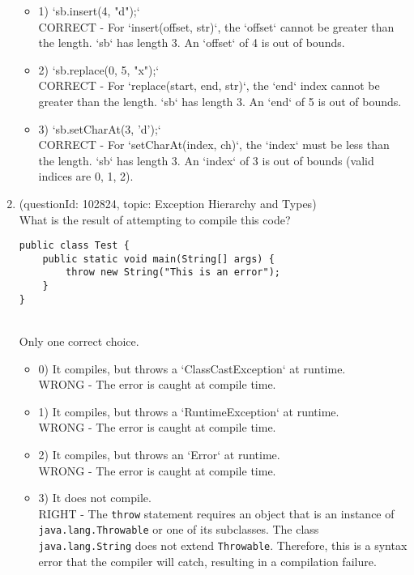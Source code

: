 \documentclass[12pt]{article}
\begin{document}
\begin{enumerate}[label=(\arabic*)]
\begin{itemize}
\item 1) `sb.insert(4, "d");`
 \\ 
CORRECT - For `insert(offset, str)`, the `offset` cannot be greater than the length. `sb` has length 3. An `offset` of 4 is out of bounds.

\item 2) `sb.replace(0, 5, "x");`
 \\ 
CORRECT - For `replace(start, end, str)`, the `end` index cannot be greater than the length. `sb` has length 3. An `end` of 5 is out of bounds.

\item 3) `sb.setCharAt(3, 'd');`
 \\ 
CORRECT - For `setCharAt(index, ch)`, the `index` must be less than the length. `sb` has length 3. An `index` of 3 is out of bounds (valid indices are 0, 1, 2).

\end{itemize}
\item (questionId: 102824, topic: Exception Hierarchy and Types) \\ 
What is the result of attempting to compile this code?
\begin{verbatim}
public class Test {
    public static void main(String[] args) {
        throw new String("This is an error");
    }
}
\end{verbatim}
\\ \noindent Only one correct choice. 
\begin{itemize}
\item 0) It compiles, but throws a `ClassCastException` at runtime.
 \\ 
WRONG - The error is caught at compile time.

\item 1) It compiles, but throws a `RuntimeException` at runtime.
 \\ 
WRONG - The error is caught at compile time.

\item 2) It compiles, but throws an `Error` at runtime.
 \\ 
WRONG - The error is caught at compile time.

\item 3) It does not compile.
 \\ 
RIGHT - The \verb|throw| statement requires an object that is an instance of \verb|java.lang.Throwable| or one of its subclasses. The class \verb|java.lang.String| does not extend \verb|Throwable|. Therefore, this is a syntax error that the compiler will catch, resulting in a compilation failure.

\end{itemize}

\end{enumerate}
\end{document}
